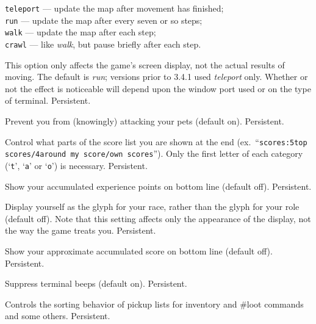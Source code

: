 {\tt teleport} --- update the map after movement has finished;\\
{\tt run} --- update the map after every seven or so steps;\\
{\tt walk} --- update the map after each step;\\
{\tt crawl} --- like {\it walk\/}, but pause briefly after each step.

This option only affects the game's screen display, not the actual
results of moving.  The default is {\it run\/}; versions prior to 3.4.1 
used {\it teleport\/} only.  Whether or not the effect is noticeable will
depend upon the window port used or on the type of terminal.  Persistent.
\item[\ib{safe\verb+_+pet}]
Prevent you from (knowingly) attacking your pets (default on).  Persistent.
\item[\ib{scores}]
Control what parts of the score list you are shown at the end (ex.\
``{\tt scores:5top scores/4around my score/own scores}'').  Only the first
letter of each category (`{\tt t}', `{\tt a}' or `{\tt o}') is necessary.
Persistent.
\item[\ib{showexp}]
Show your accumulated experience points on bottom line (default off).
Persistent.
\item[\ib{showrace}]
Display yourself as the glyph for your race, rather than the glyph
for your role (default off).  Note that this setting affects only
the appearance of the display, not the way the game treats you.
Persistent.
\item[\ib{showscore}]
Show your approximate accumulated score on bottom line (default off).
Persistent.
\item[\ib{silent}]
Suppress terminal beeps (default on).  Persistent.
\item[\ib{sortloot}]
Controls the sorting behavior of pickup lists for inventory
and \#loot commands and some others.  Persistent.

